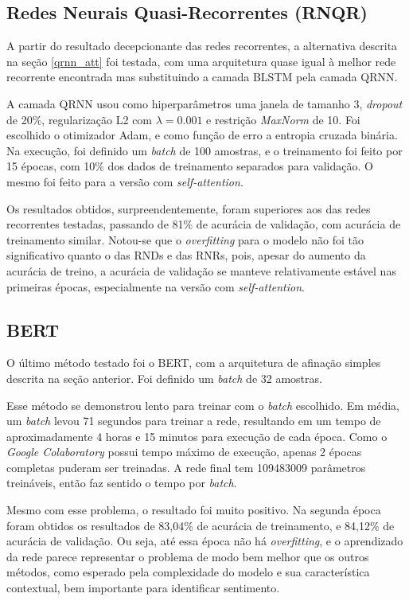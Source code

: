 \documentclass[twoside,conference,a4paper]{IEEEtran}
\begin{document}
\subsection{Redes Neurais Quasi-Recorrentes (RNQR)}

A partir do resultado decepcionante das redes recorrentes, a alternativa descrita na seção \ref{qrnn_att} foi testada, com uma arquitetura quase igual à melhor rede recorrente encontrada mas substituindo a camada BLSTM pela camada QRNN. 

A camada QRNN usou como hiperparâmetros uma janela de tamanho 3, \textit{dropout} de 20\%, regularização L2 com $\lambda = 0.001$ e restrição \textit{MaxNorm} de 10. Foi escolhido o otimizador Adam, e como função de erro a entropia cruzada binária. Na execução, foi definido um \textit{batch} de 100 amostras, e o treinamento foi feito por 15 épocas, com 10\% dos dados de treinamento separados para validação. O mesmo foi feito para a versão com \textit{self-attention}.

Os resultados obtidos, surpreendentemente, foram superiores aos das redes recorrentes testadas, passando de 81\% de acurácia de validação, com acurácia de treinamento similar. Notou-se que o \textit{overfitting} para o modelo não foi tão significativo quanto o das RNDs e das RNRs, pois, apesar do aumento da acurácia de treino, a acurácia de validação se manteve relativamente estável nas primeiras épocas, especialmente na versão com \textit{self-attention}. 

\subsection{BERT}

O último método testado foi o BERT, com a arquitetura de afinação simples descrita na seção anterior. Foi definido um \textit{batch} de 32 amostras.

Esse método se demonstrou lento para treinar com o \textit{batch} escolhido. Em média, um \textit{batch} levou 71 segundos para treinar a rede, resultando em um tempo de aproximadamente 4 horas e 15 minutos para execução de cada época. Como o \textit{Google Colaboratory} possui tempo máximo de execução, apenas 2 épocas completas puderam ser treinadas. A rede final tem 109483009 parâmetros treináveis, então faz sentido o tempo por \textit{batch}.

Mesmo com esse problema, o resultado foi muito positivo. Na segunda época foram obtidos os resultados de 83,04\% de acurácia de treinamento, e 84,12\% de acurácia de validação. Ou seja, até essa época não há \textit{overfitting}, e o aprendizado da rede parece representar o problema de modo bem melhor que os outros métodos, como esperado pela complexidade do modelo e sua característica contextual, bem importante para identificar sentimento.
\end{document}
